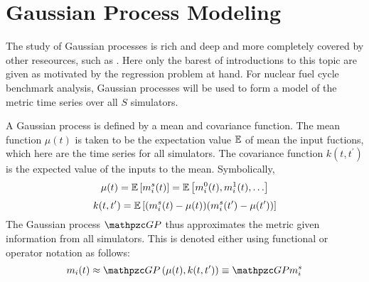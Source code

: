 \section{Gaussian Process Modeling}
\label{gp}
The study of Gaussian processes is rich and deep and more completely covered by 
other reseources, such as \cite{rasmussen2006gaussian}. Here only the barest of 
introductions to this topic are given as motivated by the regression problem at
hand. For nuclear fuel cycle benchmark analysis, Gaussian processes will be used
to form a model of the metric time series over all $S$ simulators. 

A Gaussian process is defined by a mean and covariance function. 
The mean function $\mu(t)$ is taken to be the expectation value $\mathbb{E}$ of mean
the input fuctions, which here are the time series for all simulators. The
covariance function $k(t, t^\prime)$ is the expected value of the inputs to the 
mean. Symbolically, 
\begin{equation}
\label{mean-func}
\mu(t) = \mathbb{E}\left[m_i^s(t)\right] = \mathbb{E}\left[m_i^0(t), m_i^1(t), \ldots\right]
\end{equation}
\begin{equation}
\label{covar-func}
k(t, t^\prime) = \mathbb{E}\left[(m_i^s(t) - \mu(t))(m_i^s(t^\prime) - \mu(t^\prime))\right]
\end{equation}
The Gaussian process $\GP$ thus approximates the metric given information from all 
simulators. This is denoted either using functional or operator notation as follows:
\begin{equation}
\label{gp-def-approx}
m_i(t) \approx \GP\left(\mu(t), k(t, t^\prime)\right) \equiv \GP m_i^s
\end{equation}

